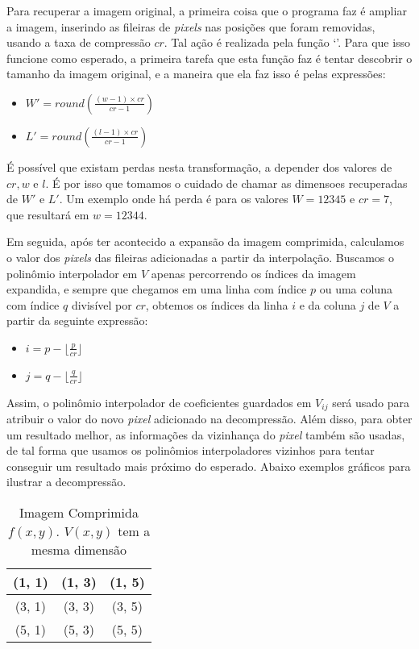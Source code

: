 \documentclass[11pt]{article}
\begin{document}
  Para recuperar a imagem original, a primeira coisa que o programa faz é ampliar a imagem, inserindo as fileiras de \textit{pixels} nas posições que foram removidas, usando a taxa de compressão $cr$.
  Tal ação é realizada pela função `{}'. Para que isso funcione como esperado, a primeira tarefa que esta função faz é tentar descobrir o tamanho da imagem original, e a maneira
  que ela faz isso é pelas expressões:

  \begin{itemize}
    \item $W' = round(\frac{(w - 1) \times cr}{cr - 1})$
    \item $L' = round(\frac{(l - 1) \times cr}{cr - 1})$
  \end{itemize}

  É possível que existam perdas nesta transformação, a depender dos valores de $cr, w$ e $l$. É por isso que tomamos o cuidado de chamar as dimensoes recuperadas de $W'$ e $L'$. Um exemplo onde há perda
  é para os valores $W = 12345$ e $cr = 7$, que resultará em $w = 12344$.

  Em seguida, após ter acontecido a expansão da imagem comprimida, calculamos o valor dos \textit{pixels} das fileiras adicionadas a partir da interpolação. Buscamos o polinômio interpolador em $V$ apenas percorrendo
  os índices da imagem expandida, e sempre que chegamos em uma linha com índice $p$ ou uma coluna com índice $q$ divisível por $cr$, obtemos os índices da linha $i$ e da coluna $j$ de $V$ a partir da seguinte expressão:

  \begin{itemize}
    \item $i = p - \lfloor \frac{p}{cr} \rfloor$
    \item $j = q - \lfloor \frac{q}{cr} \rfloor$
  \end{itemize}

  Assim, o polinômio interpolador de coeficientes guardados em $V_{ij}$ será usado para atribuir o valor do novo \textit{pixel} adicionado na decompressão.
  Além disso, para obter um resultado melhor, as informações da vizinhança do \textit{pixel} também são usadas, de tal forma que usamos os polinômios
  interpoladores vizinhos para tentar conseguir um resultado mais próximo do esperado. Abaixo exemplos gráficos para ilustrar a decompressão.

  \begin{table}[h!]
    \centering
    \begin{tabular}{| c | c | c |}
      \hline
      (1, 1) \cellcolor{gray} & (1, 3) \cellcolor{gray} & (1, 5) \cellcolor{gray} \\
      \hline
      (3, 1) \cellcolor{gray} & (3, 3) \cellcolor{gray} & (3, 5) \cellcolor{gray} \\
      \hline
      (5, 1) \cellcolor{gray} & (5, 3) \cellcolor{gray} & (5, 5) \cellcolor{gray} \\
      \hline
    \end{tabular}
    \caption*{Imagem Comprimida $f(x, y)$. $V(x, y)$ tem a mesma dimensão}
  \end{table}
\end{document}
